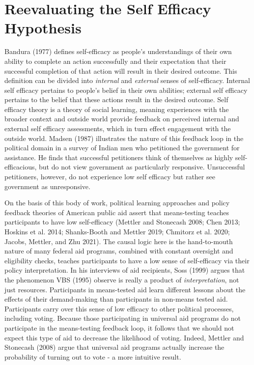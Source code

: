 \documentclass[12pt]{paper}
\begin{document}
\section{Reevaluating the Self Efficacy Hypothesis}
Bandura (1977) defines self-efficacy as people’s understandings of their own ability to complete an action successfully and their expectation that their successful completion of that action will result in their desired outcome. This definition can be divided into \textit{internal} and \textit{external} senses of self-efficacy. Internal self efficacy pertains to people's belief in their own abilities; external self efficacy pertains to the belief that these actions result in the desired outcome. Self efficacy theory is a theory of social learning, meaning experiences with the broader context and outside world provide feedback on perceived internal and external self efficacy assessments, which in turn effect engagement with the outside world. Madsen (1987) illustrates the nature of this feedback loop in the political domain in a survey of Indian men who petitioned the government for assistance. He finds that successful petitioners think of themselves as highly self-efficacious, but do not view government as particularly responsive. Unsuccessful petitioners, however, do not experience low self efficacy but rather see government as unresponsive.

On the basis of this body of work, political learning approaches and policy feedback theories of American public aid assert that means-testing teaches participants to have low self-efficacy (Mettler and Stonecash 2008; Chen 2013; Hoskins et al. 2014; Shanks-Booth and Mettler 2019; Chmitorz et al. 2020; Jacobs, Mettler, and Zhu 2021). The causal logic here is the hand-to-mouth nature of many federal aid programs, combined with constant oversight and eligibility checks, teaches participants to have a low sense of self-efficacy via their policy interpretation. In his interviews of aid recipients, Soss (1999) argues that the phenomenon VBS (1995) observe is really a product of \textit{interpretation}, not just resources. Participants in means-tested aid learn different lessons about the effects of their demand-making than participants in non-means tested aid. Participants carry over this sense of low efficacy to other political processes, including voting. Because those participating in universal aid programs do not participate in the means-testing feedback loop, it follows that we should not expect this type of aid to decrease the likelihood of voting. Indeed, Mettler and Stonecash (2008) argue that universal aid programs actually increase the probability of turning out to vote - a more intuitive result.
\end{document}
